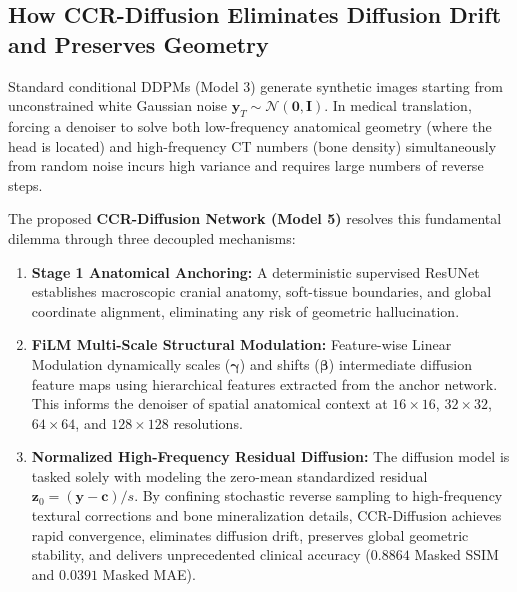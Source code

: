 \subsection{How CCR-Diffusion Eliminates Diffusion Drift and Preserves Geometry}
Standard conditional DDPMs (Model 3) generate synthetic images starting from unconstrained white Gaussian noise $\mathbf{y}_T \sim \mathcal{N}(\mathbf{0}, \mathbf{I})$. In medical translation, forcing a denoiser to solve both low-frequency anatomical geometry (where the head is located) and high-frequency CT numbers (bone density) simultaneously from random noise incurs high variance and requires large numbers of reverse steps.

The proposed \textbf{CCR-Diffusion Network (Model 5)} resolves this fundamental dilemma through three decoupled mechanisms:
\begin{enumerate}
    \item \textbf{Stage 1 Anatomical Anchoring:} A deterministic supervised ResUNet establishes macroscopic cranial anatomy, soft-tissue boundaries, and global coordinate alignment, eliminating any risk of geometric hallucination.
    \item \textbf{FiLM Multi-Scale Structural Modulation:} Feature-wise Linear Modulation dynamically scales ($\boldsymbol{\gamma}$) and shifts ($\boldsymbol{\beta}$) intermediate diffusion feature maps using hierarchical features extracted from the anchor network. This informs the denoiser of spatial anatomical context at $16\times 16$, $32\times 32$, $64\times 64$, and $128\times 128$ resolutions.
    \item \textbf{Normalized High-Frequency Residual Diffusion:} The diffusion model is tasked solely with modeling the zero-mean standardized residual $\mathbf{z}_0 = (\mathbf{y} - \mathbf{c}) / s$. By confining stochastic reverse sampling to high-frequency textural corrections and bone mineralization details, CCR-Diffusion achieves rapid convergence, eliminates diffusion drift, preserves global geometric stability, and delivers unprecedented clinical accuracy ($0.8864$ Masked SSIM and $0.0391$ Masked MAE).
\end{enumerate}
